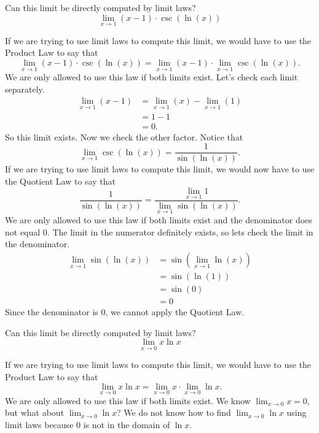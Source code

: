 \documentclass{ximera}
\begin{document}
\begin{question}
  Can this limit be directly computed by limit laws?
  \[
  \lim_{x\to 1}{(x-1)\cdot \csc(\ln(x))}
  \]
  \begin{multipleChoice}
  \end{multipleChoice}
  \begin{feedback}
    If we are trying to use limit laws to compute this limit, we would have to use the Product Law to say that
    \[
    \lim_{x\to 1}{(x-1)\cdot \csc(\ln(x))}= \lim_{x\to 1}{(x-1)\cdot \lim_{x\to 1}\csc(\ln(x))}.
    \]
    We are only allowed to use this law if both limits exist.  Let's
    check each limit separately.
    \begin{align*}
      \lim_{x\to 1} (x-1) &= \lim_{x\to 1} (x)-\lim_{x\to 1}(1)\\
      &=1-1\\
      &=0.
    \end{align*}
   So this limit exists. Now we check the other factor.
   Notice that
   \[
   \lim_{x\to 1}\csc(\ln(x)) = \frac{1}{\sin(\ln(x))}.
   \]
   If we are trying to use limit laws to compute this limit, we would now have to use the Quotient Law to say that
   \[
   \frac{1}{\sin(\ln(x))} = \frac{\lim_{x\to 1}1}{\lim_{x\to
       1}\sin(\ln(x))}.
   \]
   We are only allowed to use this law if both limits exist and the
   denominator does not equal $0$.  The limit in the numerator definitely
   exists, so lets check the limit in the denominator.
   \begin{align*}
   \lim_{x\to 1}\sin(\ln(x)) &= \sin(\lim_{x\to 1}\ln(x))\\
   &=\sin(\ln(1))\\
   &= \sin(0)\\
   &= 0
  \end{align*}
  Since the denominator is $0$, we cannot apply the Quotient Law.
  \end{feedback}
\end{question}

\begin{question}
  Can this limit be directly computed by limit laws?
  \[
  \lim_{x\to 0} x\ln x
  \]
  \begin{multipleChoice}
  \end{multipleChoice}
  \begin{feedback}
  If we are trying to use limit laws to compute this limit, we would
  have to use the Product Law to say that
  \[
  \lim_{x\to 0} x\ln x =\lim_{x\to 0} x \cdot \lim_{x\to 0}\ln x.
  \]
  We are only allowed to use this law if both limits exist.  We know
  $\lim_{x\to 0} x = 0$, but what about $\lim_{x\to 0}\ln x$?  We do
  not know how to find $\lim_{x\to 0}\ln x$ using limit laws because $0$
  is not in the domain of $\ln x$.
  \end{feedback}
\end{question}
\end{document}
